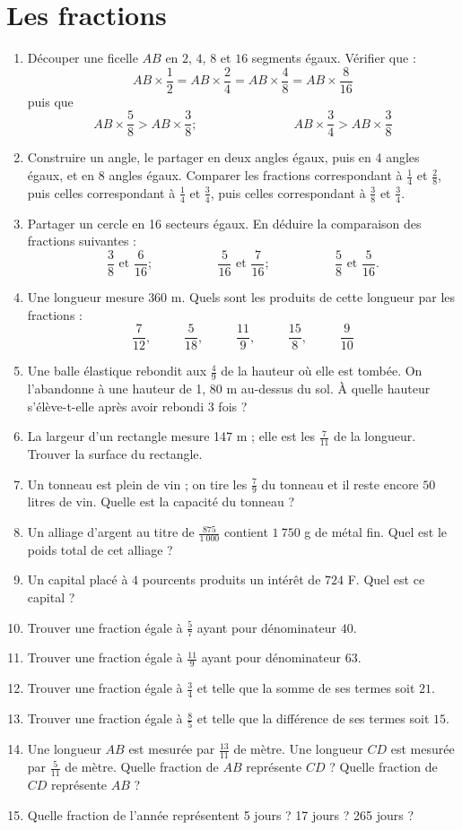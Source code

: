 \documentclass[12 pt]{report}
\theoremstyle{plain}
\newcounter{n}
\begin{document}
\chapter{Les fractions}
\begin{enumerate}
\item Découper une ficelle $AB$ en $2$, $4$, $8$ et $16$ segments égaux. Vérifier que : 
\[ AB \times \frac12 = AB \times \frac24 = AB \times \frac48 = AB \times \frac8{16}\]
puis que \[AB\times \frac58 > AB \times \frac38; \phantom{meowmeowmeow} AB \times \frac34 > AB \times
\frac38\]
\item Construire un angle, le partager en deux angles égaux, puis en 4 angles égaux, et en 8 angles égaux. Comparer les fractions correspondant à $\frac14$ et $\frac28$, puis celles correspondant à $\frac14$ et $\frac34$, puis celles correspondant à $\frac38$ et $\frac34$. 
\item Partager un cercle en 16 secteurs égaux. En déduire la comparaison des fractions suivantes : 
\[ \frac38\text{   et  } \frac6{16};\phantom{meowmeow}  \frac5{16}\text{   et  } \frac7{16};\phantom{meowmeow} 
 \frac58\text{   et  } \frac5{16}.\]
 \item Une longueur mesure  $360$ m. Quels sont les 
 produits de cette longueur par les fractions : 
 \[ \frac7{12}, \phantom{meow}\frac5{18},\phantom{meow}
 \frac{11}9,\phantom{meow}\frac{15}8, \phantom{meow}
 \frac9{10}\]
 \item Une balle élastique rebondit aux $\frac49$ de la hauteur où elle est tombée. On l'abandonne à une 
 hauteur de 1, 80 m au-dessus du sol. À quelle hauteur
 s'élève-t-elle après avoir rebondi 3 fois ? 
 \item La largeur d'un rectangle mesure 147 m ; elle est les $\frac7{11}$ de la longueur. Trouver la surface du rectangle. 
 \item Un tonneau est plein de vin ; on tire les $\frac79$ du tonneau et il reste encore $50$ litres de 
 vin. Quelle est la capacité du tonneau ? 
 \item Un alliage d'argent au titre de $\frac{875}{1~000}$ contient $1~750$ g de métal fin. Quel est le poids total de cet alliage ? 
 \item Un capital placé à $4$ pourcents produits un 
 intérêt de $724$ F. Quel est ce capital ? 
 \item Trouver une fraction égale à $\frac57$ ayant pour dénominateur $40$. 
 \item Trouver une fraction égale à $\frac{11}9$ 
 ayant pour dénominateur $63$. 
 \item Trouver une fraction égale à $\frac34$ 
 et telle que la somme de ses termes soit $21$.
 \item Trouver une fraction égale à $\frac85$ 
 et telle que la différence de ses termes soit $15$. 
 \item Une longueur $AB$ est mesurée par $\frac{13}{11}$ de mètre. Une longueur $CD$ est mesurée par $\frac5{11}$ de mètre. Quelle fraction de $AB$ représente $CD$ ? Quelle fraction de $CD$ représente 
$AB$ ? 
\item Quelle fraction de l'année représentent 5 jours ? 17 jours ? 265 jours ? 


\end{enumerate}
\end{document}
